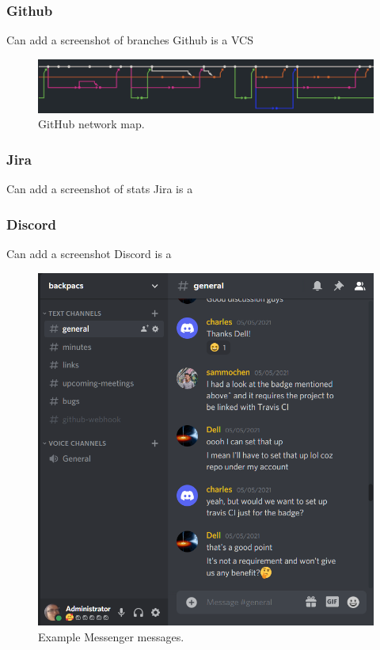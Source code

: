 \documentclass[conference]{IEEEtran}
\begin{document}
\subsubsection{Github}
Can add a screenshot of branches
Github is a VCS

\begin{figure}[htbp]
\centerline{\includegraphics[width = \linewidth]{github-network.png}}
\caption{GitHub network map.}
\label{fig}
\end{figure}

\subsubsection{Jira}
Can add a screenshot of stats
Jira is a 
\subsubsection{Discord}
Can add a screenshot
Discord is a 

\begin{figure}[htbp]
\centerline{\includegraphics[width = \linewidth]{discord.png}}
\caption{Example Messenger messages.}
\label{fig}
\end{figure}
\end{document}
